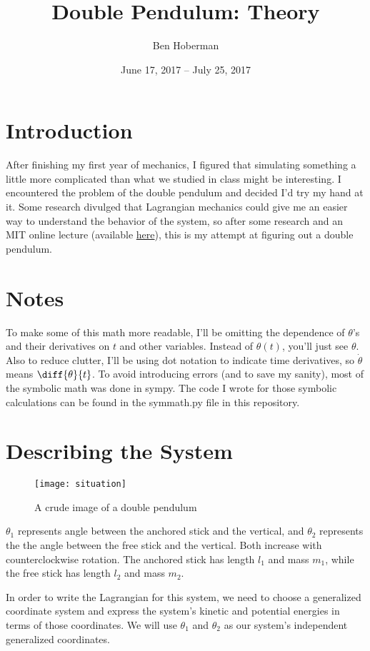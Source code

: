 \documentclass[]{article}
\title{Double Pendulum: Theory}
\author{Ben Hoberman}
\begin{document}
	
\date{June 17, 2017 -- July 25, 2017}
\maketitle

\newcommand{\lagr}{\mathcal{L}}

\section{Introduction}
After finishing my first year of mechanics, I figured that simulating something a little more complicated than what we studied in class might be interesting. I encountered the problem of the double pendulum and decided I'd try my hand at it. Some research divulged that Lagrangian mechanics could give me an easier way to understand the behavior of the system, so after some research and an MIT online lecture (available \href{https://www.youtube.com/watch?v=zhk9xLjrmi4&t=3925s}{here}), this is my attempt at figuring out a double pendulum.

\section{Notes}
To make some of this math more readable, I'll be omitting the dependence of $\theta$'s and their derivatives on $t$ and other variables. Instead of $\theta{(t)}$, you'll just see $\theta$. Also to reduce clutter, I'll be using dot notation to indicate time derivatives, so $\dot{\theta}$ means $\diff{\theta}{t}$. To avoid introducing errors (and to save my sanity), most of the symbolic math was done in sympy. The code I wrote for those symbolic calculations can be found in the symmath.py file in this repository.

\section{Describing the System}
\begin{figure}[h!]
	\texttt{[image: situation]}
	\caption{A crude image of a double pendulum}
\end{figure}
$\theta_1$ represents angle between the anchored stick and the vertical, and $\theta_2$ represents the the angle between the free stick and the vertical. Both increase with counterclockwise rotation. The anchored stick has length $l_1$ and mass $m_1$, while the free stick has length $l_2$ and mass $m_2$.

In order to write the Lagrangian for this system, we need to choose a generalized coordinate system and express the system's kinetic and potential energies in terms of those coordinates. We will use $\theta_1$ and $\theta_2$ as our system's independent generalized coordinates.
\end{document}
